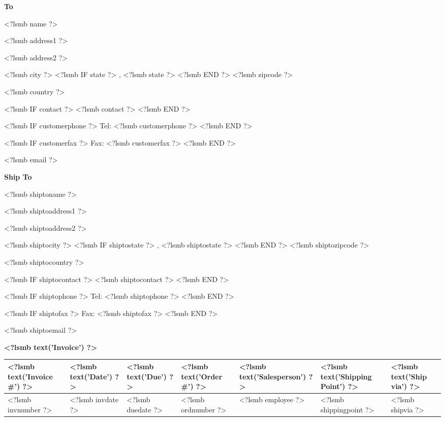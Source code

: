 \documentclass{scrartcl}
\begin{document}
\parbox[t]{.5\textwidth}{
\textbf{To}
\vspace{0.3cm}

<?lsmb name ?>

<?lsmb address1 ?>

<?lsmb address2 ?>

<?lsmb city ?>
<?lsmb IF state ?>
\hspace{-0.1cm}, <?lsmb state ?>
<?lsmb END ?>
<?lsmb zipcode ?>

<?lsmb country ?>

\vspace{0.3cm}

<?lsmb IF contact ?>
<?lsmb contact ?>
\vspace{0.2cm}
<?lsmb END ?>

<?lsmb IF customerphone ?>
Tel: <?lsmb customerphone ?>
<?lsmb END ?>

<?lsmb IF customerfax ?>
Fax: <?lsmb customerfax ?>
<?lsmb END ?>

<?lsmb email ?>
}
\parbox[t]{.5\textwidth}{
\textbf{Ship To}
\vspace{0.3cm}

<?lsmb shiptoname ?>

<?lsmb shiptoaddress1 ?>

<?lsmb shiptoaddress2 ?>

<?lsmb shiptocity ?>
<?lsmb IF shiptostate ?>
\hspace{-0.1cm}, <?lsmb shiptostate ?>
<?lsmb END ?>
<?lsmb shiptozipcode ?>

<?lsmb shiptocountry ?>

\vspace{0.3cm}

<?lsmb IF shiptocontact ?>
<?lsmb shiptocontact ?>
\vspace{0.2cm}
<?lsmb END ?>

<?lsmb IF shiptophone ?>
Tel: <?lsmb shiptophone ?>
<?lsmb END ?>

<?lsmb IF shiptofax ?>
Fax: <?lsmb shiptofax ?>
<?lsmb END ?>

<?lsmb shiptoemail ?>
}
\hfill

\vspace{1cm}

\textbf{<?lsmb text('Invoice') ?>}
\hfill

\vspace{1cm}

\begin{tabularx}{\textwidth}{*{7}{|X}|} \hline
  \textbf{<?lsmb text('Invoice #') ?>} & \textbf{<?lsmb text('Date') ?>} 
      & \textbf{<?lsmb text('Due') ?>} & \textbf{<?lsmb text('Order #') ?>}
      & \textbf{<?lsmb text('Salesperson') ?>} 
      & \textbf{<?lsmb text('Shipping Point') ?>} 
      & \textbf{<?lsmb text('Ship via'}) ?> \\ [0.5em]
  \hline
  <?lsmb invnumber ?> & <?lsmb invdate ?> & <?lsmb duedate ?> & <?lsmb ordnumber ?> & <?lsmb employee ?>
  & <?lsmb shippingpoint ?> & <?lsmb shipvia ?> \\
  \hline
\end{tabularx}
\end{document}
